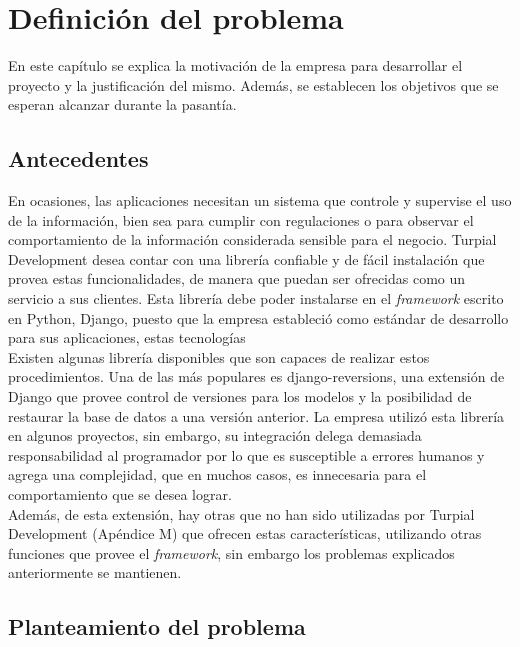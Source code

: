 \chapter{\textbf{Definición del problema}}

\thispagestyle{empty}

En este capítulo se explica la motivación de la empresa para desarrollar el
proyecto y la justificación del mismo. Además, se establecen los objetivos que
se esperan alcanzar durante la pasantía.

\section{Antecedentes}

En ocasiones, las aplicaciones necesitan un sistema que controle y supervise el uso de la información, bien sea para cumplir con regulaciones o para observar el comportamiento de la información considerada sensible para el negocio. Turpial Development desea contar con una librería confiable y de fácil instalación que provea estas funcionalidades, de manera que puedan ser ofrecidas como un servicio a sus clientes. Esta librería debe poder instalarse en el \textit{framework} escrito en Python, Django, puesto que la empresa estableció como estándar de desarrollo para sus aplicaciones, estas tecnologías \\

Existen algunas librería disponibles que son capaces de realizar estos
procedimientos. Una de las más populares es django-reversions, una extensión de
Django que provee control de versiones para los modelos y la posibilidad de
restaurar la base de datos a una versión anterior. La empresa utilizó esta
librería en algunos proyectos, sin embargo, su integración delega demasiada
responsabilidad al programador por lo que es susceptible a errores humanos y
agrega una complejidad, que en muchos casos, es innecesaria para el
comportamiento que se desea lograr. \\

Además, de esta extensión, hay otras que no han sido utilizadas por Turpial
Development (Apéndice M) que ofrecen estas características, utilizando otras
funciones que provee el \textit{framework}, sin embargo los problemas explicados
anteriormente se mantienen.

\section{Planteamiento del problema}

